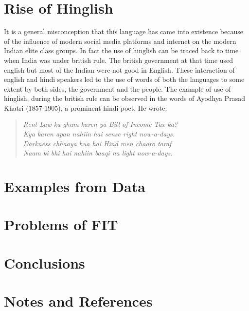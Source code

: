 \documentclass{article}
\begin{document}
\section{Rise of Hinglish}
It is a general misconception that this language has came into existence because of the influence of modern social media platforms and internet on the modern Indian elite class groups. In fact the use of hinglish can be traced back to time when India was under british rule. The british government at that time used english but most of the Indian were not good in English. These interaction of english and hindi speakers led to the use of words of both the languages to some extent by both sides, the government and the people. The example of use of hinglish, during the british rule can be observed in the words of Ayodhya Prasad Khatri (1857-1905), a prominent hindi poet. He wrote:
\begin{quote}
    \centering
    \textit{Rent Law ka gham karen ya Bill of Income Tax ka?\\
    Kya karen apan nahiin hai sense right now-a-days.\\Darkness chhaaya hua hai Hind men chaaro taraf\\
    Naam ki bhi hai nahiin baaqi na light now-a-days.}
\end{quote} 


\section{Examples from Data}

\section{Problems of FIT}

\section{Conclusions}

\section{Notes and References}
\end{document}
